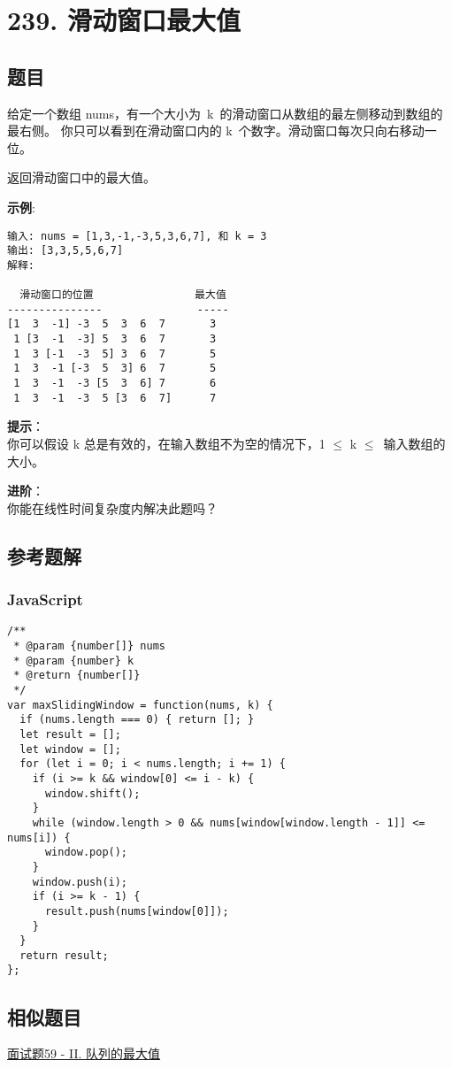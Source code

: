 \newpage
\section{239. 滑动窗口最大值}
\label{leetcode:239}

\subsection{题目}

给定一个数组 nums，有一个大小为 k 的滑动窗口从数组的最左侧移动到数组的最右侧。
你只可以看到在滑动窗口内的 k 个数字。滑动窗口每次只向右移动一位。

返回滑动窗口中的最大值。

\textbf{示例}:

\begin{verbatim}
输入: nums = [1,3,-1,-3,5,3,6,7], 和 k = 3
输出: [3,3,5,5,6,7]
解释:

  滑动窗口的位置                最大值
---------------               -----
[1  3  -1] -3  5  3  6  7       3
 1 [3  -1  -3] 5  3  6  7       3
 1  3 [-1  -3  5] 3  6  7       5
 1  3  -1 [-3  5  3] 6  7       5
 1  3  -1  -3 [5  3  6] 7       6
 1  3  -1  -3  5 [3  6  7]      7
\end{verbatim}

\textbf{提示}：\\
你可以假设 k 总是有效的，在输入数组不为空的情况下，1 $\leq$ k $\leq$ 输入数组的大小。

\textbf{进阶}：\\
你能在线性时间复杂度内解决此题吗？

\subsection{参考题解}

\subsubsection{JavaScript}

\begin{verbatim}
/**
 * @param {number[]} nums
 * @param {number} k
 * @return {number[]}
 */
var maxSlidingWindow = function(nums, k) {
  if (nums.length === 0) { return []; }
  let result = [];
  let window = [];
  for (let i = 0; i < nums.length; i += 1) {
    if (i >= k && window[0] <= i - k) {
      window.shift();
    }
    while (window.length > 0 && nums[window[window.length - 1]] <= nums[i]) {
      window.pop();
    }
    window.push(i);
    if (i >= k - 1) {
      result.push(nums[window[0]]);
    }
  }
  return result;
};
\end{verbatim}

\subsection{相似题目}

\hyperref[leetcode:sw_59_2]{面试题59 - II. 队列的最大值}
